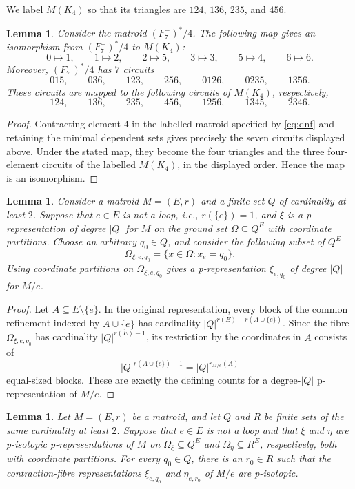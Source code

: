\documentclass[preprint,12pt]{elsarticle}
\newtheorem{lemma}[theorem]{Lemma}
\theoremstyle{definition}
\begin{document}
We label $M(K_4)$ so that its triangles are
$124$, $136$, $235$, and $456$.

\begin{lemma}\label{lem:matroid isomorphism}
	Consider the matroid $(F_7^-)^*/4$. The following map gives an isomorphism from
	$(F_7^-)^*/4$ to $M(K_4)$:
\[
0 \mapsto1,\qquad 1 \mapsto 2,\qquad 2 \mapsto 5,\qquad 3 \mapsto 3, \qquad 
5 \mapsto 4, \qquad 6 \mapsto 6.
\]
Moreover, $(F_7^-)^*/4$ has $7$ circuits 
\[
015, \qquad 036, \qquad 123, \qquad 256, \qquad 0126, \qquad 0235,
\qquad 1356.
\]
These circuits are mapped to the following circuits of $M(K_4)$, respectively,
\[
124, \qquad 136, \qquad 235, \qquad 456, \qquad 1256, \qquad 1345,
\qquad 2346.
\]
\end{lemma}

\begin{proof}
Contracting element $4$ in the labelled matroid specified by
\eqref{eq:dnf} and retaining the minimal dependent sets gives precisely the
seven circuits displayed above. Under the stated map, they become the four
triangles and the three four-element circuits of the labelled $M(K_4)$, in
the displayed order. Hence the map is an isomorphism.
\end{proof}

\begin{lemma}\label{lem:contraction-fibre}
Consider a matroid $M=(E,r)$ and a finite set $Q$ of cardinality at least $2$. Suppose that $e \in E$ is not a loop, i.e., $r(\{e\})=1$, and $\xi$ is a p-representation of degree $|Q|$ for $M$ on the ground set $\Omega \subseteq Q^E$ 
with coordinate partitions.
Choose an arbitrary $q_0 \in Q$, and consider the following subset of $Q^{E}$
\[
\Omega_{\xi,e,q_0} =\{x \in \Omega:x_e=q_0\}.
\]
Using coordinate partitions on $\Omega_{\xi,e,q_0}$ gives a p-representation $\xi_{e,q_0}$ of degree
$|Q|$ for $M/e$.
\end{lemma}

\begin{proof}
Let $A\subseteq E\setminus\{e\}$. In the original
representation, every block of the common refinement indexed by
$A\cup\{e\}$ has cardinality $|Q|^{r(E)-r(A\cup\{e\})}$. Since the fibre
$\Omega_{\xi,e,q_0}$ has cardinality $|Q|^{r(E)-1}$, its restriction by the
coordinates in $A$ consists of
\[
|Q|^{r(A\cup\{e\})-1}=|Q|^{r_{M/e}(A)}
\]
equal-sized blocks. These are exactly the defining counts for a degree-$|Q|$
p-representation of $M/e$.
\end{proof}

\begin{lemma}\label{lem: p-isotopy of contraction}
Let $M=(E,r)$ be a matroid, and let $Q$ and $R$ be finite sets
of the same cardinality at least $2$. Suppose that $e\in E$ is not a loop and
that $\xi$ and $\eta$ are p-isotopic p-representations of $M$ on
$\Omega_\xi\subseteq Q^E$ and $\Omega_\eta\subseteq R^E$, respectively, both
with coordinate partitions. For every $q_0\in Q$, there is an $r_0\in R$ such
that the contraction-fibre representations $\xi_{e,q_0}$ and
$\eta_{e,r_0}$ of $M/e$ are p-isotopic.
\end{lemma}
\end{document}
